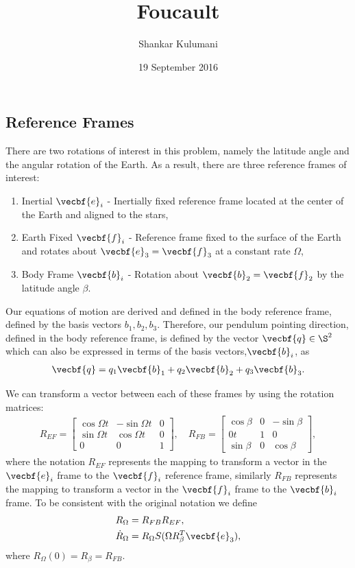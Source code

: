 \documentclass[11pt, reqno]{article}   	%
\title{Foucault}
\author{Shankar Kulumani}
\date{19 September 2016}							%
\begin{document}
\maketitle

\subsection*{Reference Frames}
There are two rotations of interest in this problem, namely the latitude angle and the angular rotation of the Earth. 
As a result, there are three reference frames of interest:
\begin{enumerate}
    \item Inertial \( \vecbf{e}_i\) - Inertially fixed reference frame located at the center of the Earth and aligned to the stars,
    \item Earth Fixed \( \vecbf{f}_i \) - Reference frame fixed to the surface of the Earth and rotates about \( \vecbf{e}_3 = \vecbf{f}_3 \) at a constant rate \( \Omega \),
    \item Body Frame \( \vecbf{b}_i \) - Rotation about \( \vecbf{b}_2 = \vecbf{f}_2 \) by the latitude angle \( \beta\).
\end{enumerate}
Our equations of motion are derived and defined in the body reference frame, defined by the basis vectors \( b_1, b_2, b_3\). 
Therefore, our pendulum pointing direction, defined in the body reference frame, is defined by the vector \( \vecbf{q} \in \S^2 \) which can also be expressed in terms of the basis vectors,\( \vecbf{b}_i \), as
\begin{align*}
    \vecbf{q} = q_1 \vecbf{b}_1 + q_2 \vecbf{b}_2 + q_3 \vecbf{b}_3 .
\end{align*}

We can transform a vector between each of these frames by using the rotation matrices:
\begin{align*}
    R_{EF} = 
    \begin{bmatrix} 
        \cos \Omega t & -\sin \Omega t & 0 \\
        \sin \Omega t & \cos \Omega t & 0 \\
        0 & 0 & 1
    \end{bmatrix} , \quad
    R_{FB} =
    \begin{bmatrix} 
        \cos \beta & 0 & -\sin \beta \\
        0 t & 1 & 0 \\
        \sin \beta & 0 & \cos \beta
    \end{bmatrix} ,
\end{align*}
where the notation \( R_{EF} \) represents the mapping to transform a vector in the \( \vecbf{e}_i \) frame to the \( \vecbf{f}_i \) reference frame, similarly \( R_{FB} \) represents the mapping to transform a vector in the \( \vecbf{f}_i \) frame to the \( \vecbf{b}_i \) frame.
To be consistent with the original notation we define
\begin{align*}
    R_\Omega &= R_{FB} R_{EF} , \\
    \dot{R}_\Omega &= R_\Omega S(\Omega R_{\beta}^T \vecbf{e}_3) ,
\end{align*}
where \( R_\Omega(0) = R_\beta = R_{FB} \).
\end{document}
